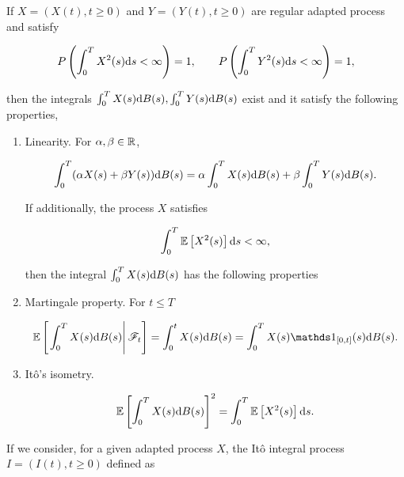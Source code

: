 \begin{theorem}
    If $X = (X(t), t \ge 0)$ and $Y = (Y(t), t \ge 0)$ are regular adapted process and satisfy

    \begin{equation*}
        P\left(  \int_0^T X^2(s) \mathrm d s < \infty  \right) = 1, \qquad P\left(  \int_0^T Y^2(s) \mathrm d s < \infty  \right) = 1,
    \end{equation*}

    \noindent then the integrals $\int_0^T X(s) \mathrm d B(s), \int_0^T Y(s) \mathrm d B(s)$ exist and it satisfy the following properties,

    \begin{enumerate}
        \item Linearity. For $\alpha,\beta \in \mathbb R$,

        \begin{equation}
            \int_0^T (\alpha X(s) + \beta Y(s))\mathrm d B(s) = \alpha \int_0^T X(s)\mathrm d B(s) + \beta \int_0^T Y(s) \mathrm d B(s).
        \end{equation}
    
    If additionally, the process $X$ satisfies 

    \begin{equation*}
        \int_0^T \mathbb E \left[ X^2(s) \right] \mathrm d s < \infty,
    \end{equation*}

    then the integral $\int_0^T X(s) \mathrm d B(s)$ has the following properties

    \item Martingale property. For $t \le T$
    
    \begin{equation*}
        \E{ \left. \int_0^T X(s) \d B(s) \right| \F_t  } = \int_0^t X(s) \d B(s) = \int_0^T X(s)\mathds 1_{[0,t]}(s) \d B(s).
    \end{equation*}

    \item Itô's isometry. 
    
    \begin{equation*}
        \mathbb E \left[  \int_0^T X(s) \mathrm d B(s)  \right]^2 = \int_0^T \mathbb E \left[ X^2(s) \right] \mathrm d s.
    \end{equation*}
    
    \end{enumerate}
\end{theorem}

If we consider, for a given adapted process $X$, the Itô integral process $I=(I(t), t \ge 0)$ defined as

